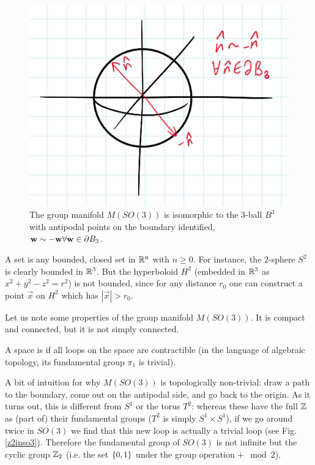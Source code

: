 \begin{figure}\label{so3manifold}
\includegraphics[scale=0.7]{2018/10/20181009_img1}
\caption{The group manifold $M(SO(3))$ is isomorphic to the 3-ball $B^3$ with antipodal points on the boundary identified, $\boldsymbol{\mathbf{w}} \sim -\boldsymbol{\mathbf{w}} \forall \boldsymbol{\mathbf{w}} \in \partial B_3$.}
\end{figure}

\begin{defn}
A  set is any bounded, closed set in $\mathbb{R}^n$ with $n\geq 0$. For instance, the $2$-sphere $S^2$ is clearly bounded in $\mathbb{R}^3$. But the hyperboloid $H^2$ (embedded in $\mathbb{R}^3$ as $x^2+y^2-z^2 =r^2$) is not bounded, since for any distance $r_0$ one can construct a point $\vec{x}$ on $H^2$ which has $|\vec{x}|>r_0$.
\end{defn}

Let us note some properties of the group manifold $M(SO(3))$. It is compact and connected, but it is not simply connected.
\begin{defn}
A space is  if all loops on the space are contractible (in the language of algebraic topology, its fundamental group $\pi_1$ is trivial).
\end{defn}
A bit of intuition for why $M(SO(3))$ is topologically non-trivial: draw a path to the boundary, come out on the antipodal side, and go back to the origin. As it turns out, this is different from $S^1$ or the torus $T^2$: whereas these have the full $\mathbb{Z}$ as (part of) their fundamental groups ($T^2$ is simply $S^1\times S^1$), if we go around twice in $SO(3)$ we find that this new loop is actually a trivial loop (see Fig. \ref{z2inso3}). Therefore the fundamental group of $SO(3)$ is not infinite but the cyclic group $\mathbb{Z}_2$ (i.e. the set $\{0,1\}$ under the group operation $+\mod 2$).

